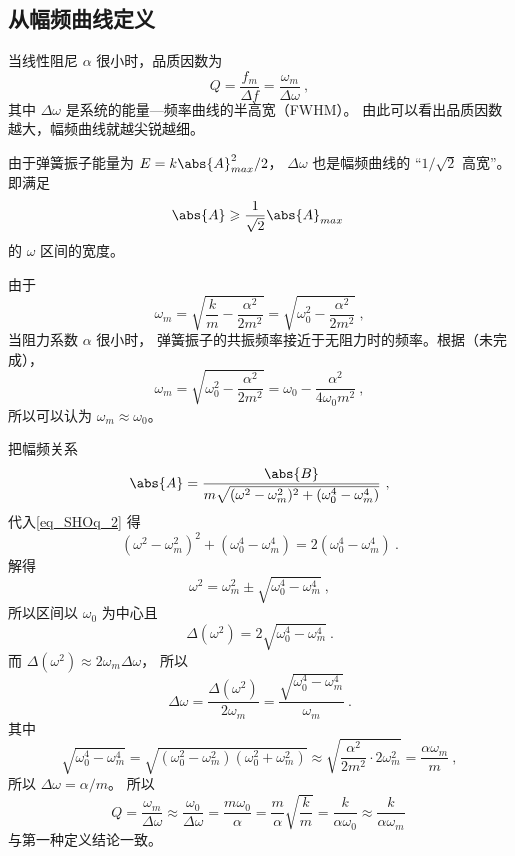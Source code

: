 \subsection{从幅频曲线定义}
当线性阻尼 $\alpha$ 很小时，品质因数为
\begin{equation}
Q = \frac{f_m}{\Delta {f}} = \frac{\omega_m}{\Delta \omega}~,
\end{equation}
其中 $\Delta\omega$ 是系统的能量—频率曲线的半高宽（FWHM）。%
由此可以看出品质因数越大，幅频曲线就越尖锐越细。

由于弹簧振子能量为 $E = k\abs{A}_{max}^2/2$， $\Delta \omega$ 也是幅频曲线的 “$1/\sqrt{2}$ 高宽”。 即满足
\begin{equation}\label{eq_SHOq_2}
\abs{A} \geqslant \frac{1}{\sqrt{2}} \abs{A}_{max}~
\end{equation}
的 $\omega$ 区间的宽度。

由于
\begin{equation}
\omega_m = \sqrt{\frac{k}{m} - \frac{\alpha^2}{2m^2}} = \sqrt{\omega_0^2 - \frac{\alpha^2}{2m^2}}~,
\end{equation}
当阻力系数 $\alpha$ 很小时， 弹簧振子的共振频率接近于无阻力时的频率。根据（未完成），
\begin{equation}
\omega_m = \sqrt{\omega_0^2 - \frac{\alpha^2}{2m^2}} = \omega_0 - \frac{\alpha^2}{4\omega_0 m^2}~,
\end{equation}
所以可以认为 $\omega_m \approx \omega_0$。

把幅频关系
\begin{equation}
\abs{A} = \frac{\abs{B}}{m\sqrt{(\omega^2 - \omega_m^2)^2 + (\omega_0^4 - \omega_m^4)}}~,
\end{equation}
代入\autoref{eq_SHOq_2} 得
\begin{equation}
(\omega^2 - \omega_m^2)^2 + (\omega_0^4 - \omega_m^4) = 2(\omega_0^4 - \omega_m^4)~.
\end{equation}
解得
\begin{equation}
\omega^2 = \omega_m^2 \pm \sqrt{\omega_0^4 - \omega_m^4}~,
\end{equation}
所以区间以 $\omega_0$ 为中心且
\begin{equation}
\Delta(\omega^2) = 2\sqrt{\omega_0^4 - \omega_m^4}~.
\end{equation}
而 $\Delta(\omega^2) \approx 2\omega_m \Delta \omega$， 所以
\begin{equation}
\Delta \omega =  \frac{\Delta(\omega^2)}{2\omega_m} = \frac{\sqrt{\omega_0^4 - \omega_m^4}}{\omega_m}~.
\end{equation}
其中
\begin{equation}
\sqrt{\omega_0^4 - \omega_m^4} = \sqrt{(\omega_0^2 - \omega_m^2)(\omega_0^2 + \omega_m^2)}
\approx \sqrt{\frac{\alpha^2}{2m^2} \cdot 2\omega_m^2} = \frac{\alpha\omega_m}{m}~,
\end{equation}
所以 $\Delta \omega = {\alpha}/{m}$。 所以
\begin{equation}
Q = \frac{\omega_m}{\Delta \omega} \approx \frac{\omega_0}{\Delta \omega} = \frac{m\omega_0}{\alpha} = \frac{m}{\alpha} \sqrt{\frac{k}{m}} = \frac{k}{\alpha \omega_0}
\approx \frac{k}{\alpha\omega_m}~
\end{equation}
与第一种定义结论一致。
